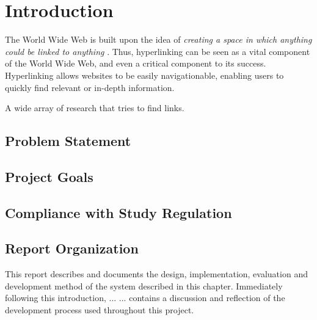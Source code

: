 \chapter{Introduction}
The World Wide Web is built upon the idea of \emph{creating a space in which anything could be linked to anything} . Thus, hyperlinking can be seen as a vital component of the World Wide Web, and even a critical component to its success. Hyperlinking allows websites to be easily navigationable, enabling users to quickly find relevant or in-depth information.

A wide array of research that tries to find links.


\section{Problem Statement}
\dummy

\section{Project Goals}

\section{Compliance with Study Regulation}

\section{Report Organization}
This report describes and documents the design, implementation, evaluation and development method of the system described in this chapter. Immediately following this introduction,  ... \dummy ...  contains a discussion and reflection of the development process used throughout this project.